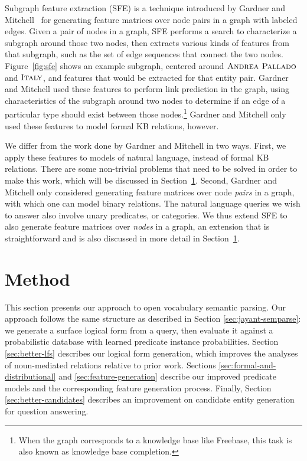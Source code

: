 \documentclass[11pt]{article}
\newcommand{\secref}[1]{Section~\ref{sec:#1}}
\newcommand{\figref}[1]{Figure~\ref{fig:#1}}
\newcommand{\entity}[1]{\ensuremath{\textsc{#1}}}
\begin{document}
Subgraph feature extraction (SFE) is a technique introduced by Gardner and
Mitchell~ for generating feature matrices over node
pairs in a graph with labeled edges.  Given a pair of nodes in a graph, SFE
performs a search to characterize a subgraph around those two nodes, then
extracts various kinds of features from that subgraph, such as the set of edge
sequences that connect the two nodes.  \figref{sfe} shows an example subgraph,
centered around \entity{Andrea Pallado} and \entity{Italy}, and features that
would be extracted for that entity pair.  Gardner and Mitchell used these
features to perform link prediction in the graph, using characteristics of the
subgraph around two nodes to determine if an edge of a particular type should
exist between those nodes.\footnote{When the graph corresponds to a knowledge
base like Freebase, this task is also known as knowledge base completion.}
Gardner and Mitchell only used these features to model formal KB relations,
however.

We differ from the work done by Gardner and Mitchell in two ways.  First, we
apply these features to models of natural language, instead of formal KB
relations.  There are some non-trivial problems that need to be solved in order
to make this work, which will be discussed in \secref{method}.  Second, Gardner
and Mitchell only considered generating feature matrices over node \emph{pairs}
in a graph, with which one can model binary relations.  The natural language
queries we wish to answer also involve unary predicates, or categories.  We
thus extend SFE to also generate feature matrices over \emph{nodes} in a graph,
an extension that is straightforward and is also discussed in more detail in
\secref{method}.

\section{Method}
\label{sec:method}

This section presents our approach to open vocabulary semantic
parsing. Our approach follows the same structure as described in
Section \ref{sec:jayant-semparse}: we generate a surface logical form
from a query, then evaluate it against a probabilistic database with
learned predicate instance probabilities. Section \ref{sec:better-lfs}
describes our logical form generation, which improves the analyses of
noun-mediated relations relative to prior work. Sections
\ref{sec:formal-and-distributional} and \ref{sec:feature-generation}
describe our improved predicate models and the corresponding feature
generation process. Finally, Section \ref{sec:better-candidates}
describes an improvement on candidate entity generation for question
answering.
\end{document}
